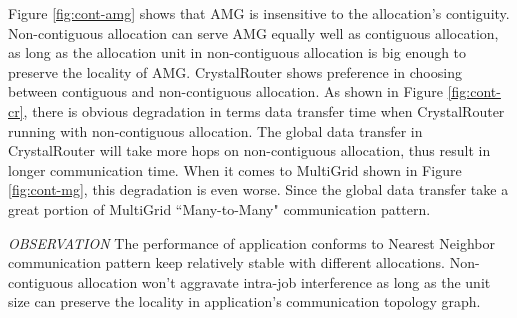 \documentclass[conference]{IEEEtran}
\begin{document}
Figure \ref{fig:cont-amg} shows that AMG is insensitive to the allocation's contiguity. Non-contiguous allocation can serve AMG equally well as contiguous allocation, as long as the allocation unit in non-contiguous allocation is big enough to preserve the locality of AMG. CrystalRouter shows preference in choosing between contiguous and non-contiguous allocation. As shown in Figure \ref{fig:cont-cr}, there is obvious degradation in terms data transfer time when CrystalRouter running with non-contiguous allocation. The global data transfer in CrystalRouter will take more hops on non-contiguous allocation, thus result in longer communication time. When it comes to MultiGrid shown in Figure \ref{fig:cont-mg}, this degradation is even worse. Since the global data transfer take a great portion of MultiGrid ``Many-to-Many" communication pattern. 

\emph{OBSERVATION}
The performance of application conforms to Nearest Neighbor communication pattern keep relatively stable with different allocations. Non-contiguous allocation won't aggravate intra-job interference as long as the unit size can preserve the locality in application's communication topology graph. 
\end{document}
